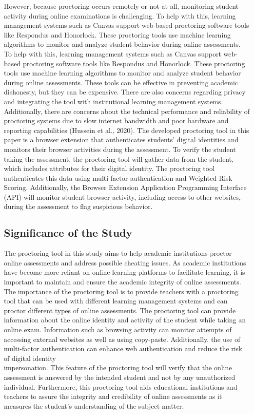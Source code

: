 \documentclass{icsthesis}
\begin{document}
\begin{mainmatter}
\indent However, because proctoring occurs remotely or not at all, monitoring student activity during online examinations is challenging. To help with this, learning management systems such as Canvas support web-based proctoring software tools like Respondus and Honorlock. These proctoring tools use machine learning algorithms to monitor and analyze student behavior during online assessments. To help with this, learning management systems such as Canvas support web-based proctoring software tools like Respondus and Honorlock. These proctoring tools use machine learning algorithms to monitor and analyze student behavior during online assessments. These tools can be effective in preventing academic dishonesty, but they can be expensive. There are also concerns regarding privacy and integrating the tool with institutional learning management systems. Additionally, there are concerns about the technical performance and reliability of proctoring systems due to slow internet bandwidth and poor hardware and reporting capabilities (Hussein et al., 2020). The developed proctoring tool in this paper is a browser extension that authenticates students' digital identities and monitors their browser activities during the assessment. To verify the student taking the assessment, the proctoring tool will gather data from the student, which includes attributes for their digital identity. The proctoring tool authenticates this data using multi-factor authentication and Weighted Risk Scoring. Additionally, the Browser Extension Application Programming Interface (API) will monitor student browser activity, including access to other websites, during the assessment to flag suspicious behavior.

\subsection{Significance of the Study}

The proctoring tool in this study aims to help academic institutions proctor online assessments and address possible cheating issues. As academic institutions have become more reliant on online learning platforms to facilitate learning, it is important to maintain and ensure the academic integrity of online assessments. The importance of the proctoring tool is to provide teachers with a proctoring tool that can be used with different learning management systems and can proctor different types of online assessments. The proctoring tool can provide information about the online identity and activity of the student while taking an online exam. Information such as browsing activity can monitor attempts of accessing external websites as well as using copy-paste. Additionally, the use of multi-factor authentication can enhance web authentication and reduce the risk of digital identity \\
impersonation. This feature of the proctoring tool will verify that the online assessment is answered by the intended student and not by any unauthorized individual. Furthermore, this proctoring tool aids educational institutions and teachers to assure the integrity and credibility of online assessments as it measures the student’s understanding of the subject matter.


\end{mainmatter}
\end{document}
